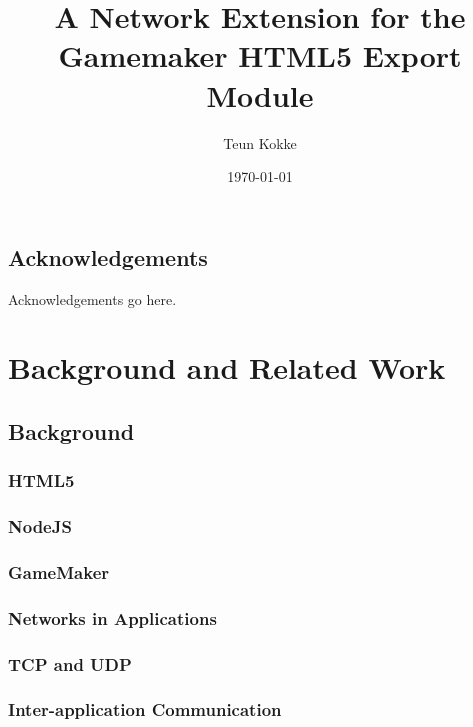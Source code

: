 \documentclass[bsc,frontabs,twoside,singlespacing,parskip,deptreport]{infthesis}     %
\begin{document}
\title{A Network Extension for the Gamemaker HTML5 Export Module}

\author{Teun Kokke}

\date{\today}


\maketitle

\section*{Acknowledgements}
Acknowledgements go here. 

\tableofcontents




\chapter{Background and Related Work}
\section{Background}
\subsection{HTML5}
\subsection{NodeJS}
\subsection{GameMaker}
\subsection{Networks in Applications}
\subsection{TCP and UDP}
\subsection{Inter-application Communication}
\end{document}
